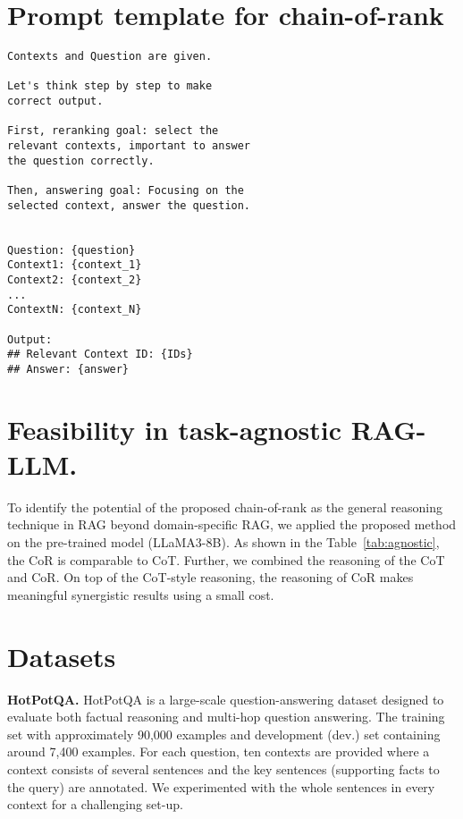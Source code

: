 \appendix
\supptitle

\section{Prompt template for chain-of-rank}
\begin{tcolorbox}[fonttitle=\small\bfseries,
fontupper=\scriptsize\sffamily,
fontlower=\fon{put},
colback=gray!5!white, colframe=gray!75!black,
enhanced,
left=2pt, right=2pt, top=2pt, bottom=2pt,
title=Prompt template for domain-specific RAG with CoR]
\begin{lstlisting}[]
Contexts and Question are given. 

Let's think step by step to make 
correct output. 

First, reranking goal: select the 
relevant contexts, important to answer 
the question correctly. 

Then, answering goal: Focusing on the 
selected context, answer the question. 


Question: {question}
Context1: {context_1}
Context2: {context_2}
...
ContextN: {context_N}

Output:
## Relevant Context ID: {IDs}
## Answer: {answer}
\end{lstlisting}
\end{tcolorbox}


\section{Feasibility in task-agnostic RAG-LLM.} 
To identify the potential of the proposed chain-of-rank as the general reasoning technique in RAG beyond domain-specific RAG, we applied the proposed method on the pre-trained model (LLaMA3-8B). As shown in the Table~\ref{tab:agnostic}, the CoR is comparable to CoT.
Further, we combined the reasoning of the CoT and CoR. On top of the CoT-style reasoning, the reasoning of CoR makes meaningful synergistic results using a small cost.



\section{Datasets}
\noindent \textbf{HotPotQA.} HotPotQA is a large-scale question-answering dataset designed to evaluate both factual reasoning and multi-hop question answering. The training set with approximately 90,000 examples and development (dev.) set containing around 7,400 examples. For each question, ten contexts are provided where a context consists of several sentences and the key sentences (supporting facts to the query) are annotated. We experimented with the whole sentences in every context for a challenging set-up.


